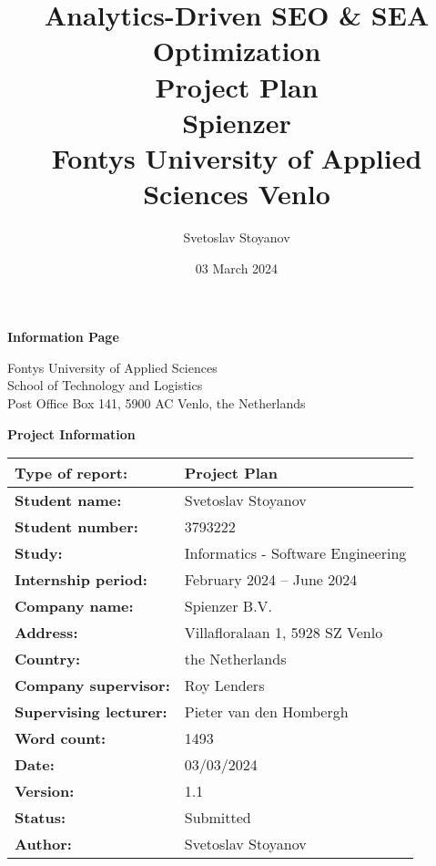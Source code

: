 \documentclass[12pt,a4paper]{article}
\title{
    {\Large Analytics-Driven SEO \& SEA Optimization}\\
    {\large Project Plan}\\[1em]
    {\normalsize \textbf{Spienzer}}\\
    {\normalsize Fontys University of Applied Sciences Venlo}
}
\author{Svetoslav Stoyanov}
\date{03 March 2024}
\begin{document}
\maketitle
\thispagestyle{empty}
\clearpage



\maketitle
\newpage

\begin{center}
    \Large\textbf{Information Page}


Fontys University of Applied Sciences\\

School of Technology and Logistics\\
Post Office Box 141, 5900 AC Venlo, the Netherlands
\end{center}



\begin{center}
    \Large\textbf{Project Information}

\vspace{1em} %

\begin{tabular}{|l|l|} \hline 
    \textbf{Type of report:} & Project Plan \\ \hline 
    \textbf{Student name:} & Svetoslav Stoyanov \\ \hline 
    \textbf{Student number:} & 3793222 \\ \hline 
    \textbf{Study:} & Informatics - Software Engineering \\ \hline 
    \textbf{Internship period:} & February 2024 – June 2024 \\ \hline 
    \textbf{Company name:} & Spienzer B.V. \\ \hline 
    \textbf{Address:} & Villafloralaan 1, 5928 SZ Venlo \\ \hline 
    \textbf{Country:} & the Netherlands \\ \hline 
    \textbf{Company supervisor:} & Roy Lenders \\ \hline 
    \textbf{Supervising lecturer:} & Pieter van den Hombergh \\ \hline 
    \textbf{Word count:} & 1493 \\ \hline 
    \textbf{Date:} & 03/03/2024 \\ \hline 
    \textbf{Version:} & 1.1 \\ \hline 
    \textbf{Status:} & Submitted \\ \hline 
    \textbf{Author:} & Svetoslav Stoyanov \\ \hline
\end{tabular}
\end{center}
\end{document}

